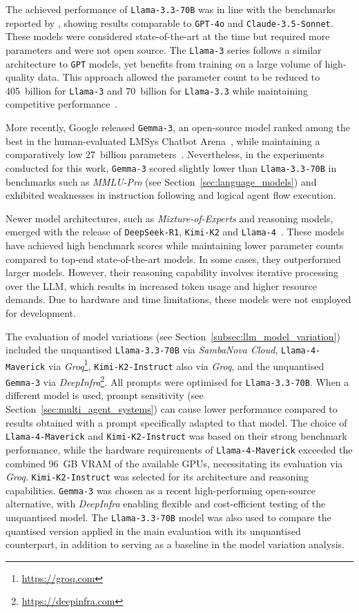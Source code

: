 \documentclass[a4paper,oneside,bibliography=totoc]{scrbook}
\begin{document}
The achieved performance of \texttt{Llama-3.3-70B} was in line with the benchmarks reported by \citet{Meta2024}, showing results comparable to \texttt{GPT-4o} and \texttt{Claude-3.5-Sonnet}. These models were considered state-of-the-art at the time but required more parameters and were not open source. The \texttt{Llama-3} series follows a similar architecture to \texttt{GPT} models, yet benefits from training on a large volume of high-quality data. This approach allowed the parameter count to be reduced to 405~billion for \texttt{Llama-3} and 70~billion for \texttt{Llama-3.3} while maintaining competitive performance~\cite{Grattafiori2024,Meta2024}.

More recently, Google released \texttt{Gemma-3}, an open-source model ranked among the best in the human-evaluated LMSys Chatbot Arena~\cite{Chiang2024}, while maintaining a comparatively low 27~billion parameters~\cite{Team2025}. Nevertheless, in the experiments conducted for this work, \texttt{Gemma-3} scored slightly lower than \texttt{Llama-3.3-70B} in benchmarks such as \textit{MMLU-Pro} (see Section~\ref{sec:language_models}) and exhibited weaknesses in instruction following and logical agent flow execution.

Newer model architectures, such as \textit{Mixture-of-Experts} and reasoning models, emerged with the release of \texttt{DeepSeek-R1}, \texttt{Kimi-K2} and \texttt{Llama-4}~\cite{KimiTeam2025,DeepSeekAI2025,MetaAI2025}. These models have achieved high benchmark scores while maintaining lower parameter counts compared to top-end state-of-the-art models. In some cases, they outperformed larger models. However, their reasoning capability involves iterative processing over the \ac{LLM}, which results in increased token usage and higher resource demands. Due to hardware and time limitations, these models were not employed for development.

The evaluation of model variations (see Section~\ref{subsec:llm_model_variation}) included the unquantised \texttt{Llama-3.3-70B} via \textit{SambaNova Cloud}, \texttt{Llama-4-Maverick} via \textit{Groq}\footnote{\url{https://groq.com}}, \texttt{Kimi-K2-Instruct} also via \textit{Groq}, and the unquantised \texttt{Gemma-3} via \textit{DeepInfra}\footnote{\url{https://deepinfra.com}}. All prompts were optimised for \texttt{Llama-3.3-70B}. When a different model is used, prompt sensitivity (see Section~\ref{sec:multi_agent_systems}) can cause lower performance compared to results obtained with a prompt specifically adapted to that model. The choice of \texttt{Llama-4-Maverick} and \texttt{Kimi-K2-Instruct} was based on their strong benchmark performance, while the hardware requirements of \texttt{Llama-4-Maverick} exceeded the combined 96~GB VRAM of the available GPUs, necessitating its evaluation via \textit{Groq}. \texttt{Kimi-K2-Instruct} was selected for its architecture and reasoning capabilities. \texttt{Gemma-3} was chosen as a recent high-performing open-source alternative, with \textit{DeepInfra} enabling flexible and cost-efficient testing of the unquantised model. The \texttt{Llama-3.3-70B} model was also used to compare the quantised version applied in the main evaluation with its unquantised counterpart, in addition to serving as a baseline in the model variation analysis.
\end{document}
